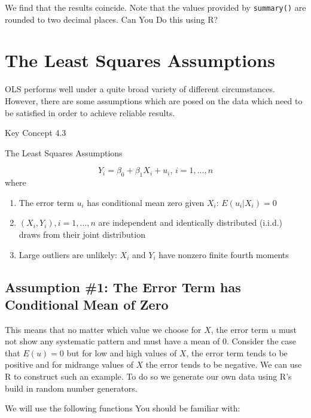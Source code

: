 \documentclass[]{book}
\providecommand{\tightlist}{%
  \setlength{\itemsep}{0pt}\setlength{\parskip}{0pt}}
\theoremstyle{definition}
\theoremstyle{definition}
\theoremstyle{definition}
\theoremstyle{remark}
\begin{document}
We find that the results coincide. Note that the values provided by
\texttt{summary()} are rounded to two decimal places. Can You Do this
using R?

\section{The Least Squares
Assumptions}\label{the-least-squares-assumptions}

OLS performs well under a quite broad variety of different
circumstances. However, there are some assumptions which are posed on
the data which need to be satisfied in order to achieve reliable
results.

Key Concept 4.3

The Least Squares Assumptions

\[Y_i = \beta_0 + \beta_1 X_i + u_i \text{, } i = 1, ...,n\] where

\begin{enumerate}
\def\labelenumi{\arabic{enumi}.}
\tightlist
\item
  The error term \(u_i\) has conditional mean zero given \(X_i\):
  \(E(u_i|X_i) = 0\)
\item
  \((X_i,Y_i), i = 1,...,n\) are independent and identically distributed
  (i.i.d.) draws from their joint distribution
\item
  Large outliers are unlikely: \(X_i\) and \(Y_i\) have nonzero finite
  fourth moments
\end{enumerate}

\subsection*{Assumption \#1: The Error Term has Conditional Mean of
Zero}\label{assumption-1-the-error-term-has-conditional-mean-of-zero}

This means that no matter which value we choose for \(X\), the error
term \(u\) must not show any systematic pattern and must have a mean of
\(0\). Consider the case that \(E(u) = 0\) but for low and high values
of \(X\), the error term tends to be positive and for midrange values of
\(X\) the error tends to be negative. We can use R to construct such an
example. To do so we generate our own data using R's build in random
number generators.

We will use the following functions You should be familiar with:
\end{document}
